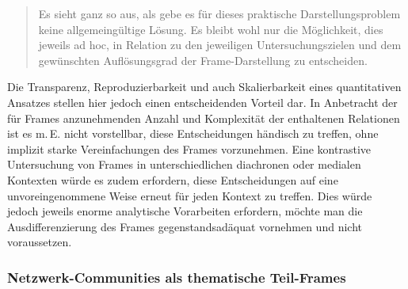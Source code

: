 \begin{quote}
Es sieht ganz so aus, als gebe es für dieses praktische Darstellungsproblem keine allgemeingültige Lösung. Es bleibt wohl nur die Möglichkeit, dies jeweils ad hoc, in Relation zu den jeweiligen Untersuchungszielen und dem gewünschten Auflösungsgrad der Frame-Darstellung zu entscheiden. \autocite[77]{busseBedeutungsUndBegriffswissen2018}
\end{quote}

Die Transparenz, Reproduzierbarkeit und auch Skalierbarkeit eines quantitativen Ansatzes stellen hier jedoch einen entscheidenden Vorteil dar. In Anbetracht der für Frames anzunehmenden Anzahl und Komplexität der enthaltenen Relationen ist es m.\,E. nicht vorstellbar, diese Entscheidungen händisch zu treffen, ohne implizit starke Vereinfachungen des Frames vorzunehmen. Eine kontrastive Untersuchung von Frames in unterschiedlichen diachronen oder medialen Kontexten würde es zudem erfordern, diese Entscheidungen auf eine unvoreingenommene Weise erneut für jeden Kontext zu treffen. Dies würde jedoch jeweils enorme analytische Vorarbeiten erfordern, möchte man die Ausdifferenzierung des Frames gegenstandsadäquat vornehmen und nicht voraussetzen.

\subsubsection{Netzwerk-Communities als thematische Teil-Frames}\label{netzwerk-communities-als-thematische-teil-frames}

